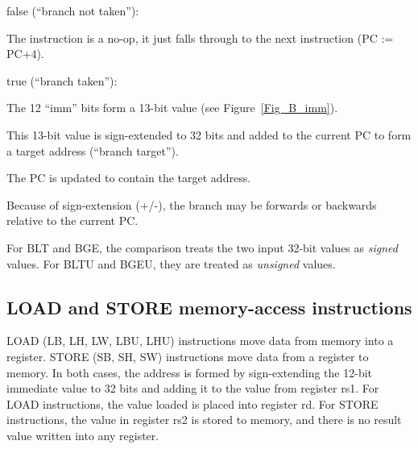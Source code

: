 \begin{tightlist}

  \item false (``branch not taken''):

    \begin{tightlist}
      \item The instruction is a no-op, it just falls through to the
            next instruction (PC := PC+4).
    \end{tightlist}

  \item true (``branch taken''):

    \begin{tightlist}
      \item The 12 ``imm'' bits form a 13-bit value (see
            Figure~\ref{Fig_B_imm}).

      \item This 13-bit value is sign-extended to 32 bits and added to
            the current PC to form a target address (``branch
            target'').
            
      \item The PC is updated to contain the target address.
    \end{tightlist}

\end{tightlist}

Because of sign-extension (+/-), the branch may be forwards or
backwards relative to the current PC.

For BLT and BGE, the comparison treats the two input 32-bit values as
\emph{signed} values.  For BLTU and BGEU, they are treated as
\emph{unsigned} values.


\subsection{LOAD and STORE memory-access instructions}

LOAD (LB, LH, LW, LBU, LHU) instructions move data from memory into a
register.  STORE (SB, SH, SW) instructions move data from a register
to memory.  In both cases, the address is formed by sign-extending the
12-bit immediate value to 32 bits and adding it to the value from
register rs1.  For LOAD instructions, the value loaded is placed into
register rd.  For STORE instructions, the value in register rs2 is
stored to memory, and there is no result value written into any
register.


